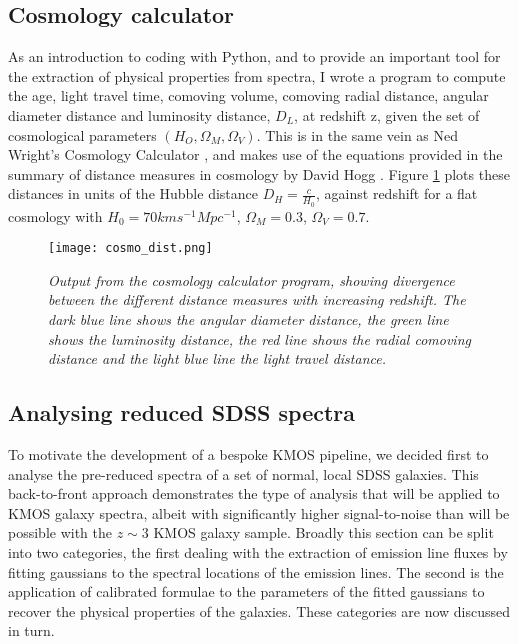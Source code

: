 \documentclass{literature}
\begin{document}
\subsection{Cosmology calculator}\label{subsec:cosmo_calc}
As an introduction to coding with Python, and to provide an important tool for the extraction of physical properties from spectra, I wrote a program to compute the age, light travel time, comoving volume, comoving radial distance, angular diameter distance and luminosity distance, $D_{L}$, at redshift z, given the set of cosmological parameters $(H_{O}, \Omega _{M}, \Omega _{V})$. This is in the same vein as Ned Wright's Cosmology Calculator \citep{Wright2006}, and makes use of the equations provided in the summary of distance measures in cosmology by David Hogg \citep{Hogg1999}. Figure \ref{fig:cosmo_calc} plots these distances in units of the Hubble distance $D_{H} = \frac{c}{H_{0}}$, against redshift for a flat cosmology with $H_{0} = 70kms^{-1}Mpc^{-1}$, $\Omega _{M} = 0.3$, $\Omega _{V} = 0.7$.  

\begin{figure}[!htp]
\centering
\texttt{[image: cosmo\_dist.png]}
\caption{\footnotesize{\emph{Output from the cosmology calculator program, showing divergence between the different distance measures with increasing redshift. The dark blue line shows the angular diameter distance, the green line shows the luminosity distance, the red line shows the radial comoving distance and the light blue line the light travel distance.}}}
\label{fig:cosmo_calc}
\end{figure}    

\subsection{Analysing reduced SDSS spectra}\label{subsec:sdss_spec}
To motivate the development of a bespoke KMOS pipeline, we decided first to analyse the pre-reduced spectra of a set of normal, local SDSS galaxies. This back-to-front approach demonstrates the type of analysis that will be applied to KMOS galaxy spectra, albeit with significantly higher signal-to-noise than will be possible with the $z\sim 3$ KMOS galaxy sample. 
Broadly this section can be split into two categories, the first dealing with the extraction of emission line fluxes by fitting gaussians to the spectral locations of the emission lines. The second is the application of calibrated formulae to the parameters of the fitted gaussians to recover the physical properties of the galaxies. These categories are now discussed in turn.  
\end{document}
